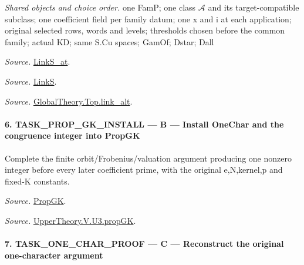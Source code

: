 \emph{Shared objects and choice order.} one FamP; one class $\mathcal A$ and its target-compatible subclass; one coefficient field per family datum; one x and i at each application; original selected rows, words and levels; thresholds chosen before the common family; actual KD; same S.Cu spaces; GamOf; Dstar; Dall

\emph{Source.} \href{https://github.com/CocoSgt/riemann-hypothesis-lean/blob/7cbf7a0c32fca1badf05931879a37c3f8a2b03b4/src/Formalism/SharpRestriction/GlobalTheoremInputs.lean#L145-L149}{LinkS\_\allowbreak at}.

\emph{Source.} \href{https://github.com/CocoSgt/riemann-hypothesis-lean/blob/7cbf7a0c32fca1badf05931879a37c3f8a2b03b4/src/Formalism/SharpRestriction/GlobalTheoremInputs.lean#L152-L157}{LinkS}.

\emph{Source.} \href{https://github.com/CocoSgt/riemann-hypothesis-lean/blob/7cbf7a0c32fca1badf05931879a37c3f8a2b03b4/src/Development/AbelianVarietyTheory/Proofs/GlobalInterpolation/LinkAlt.lean#L16-L50}{GlobalTheory.Top.link\_\allowbreak alt}.



\paragraph{6. TASK\_\allowbreak PROP\_\allowbreak GK\_\allowbreak INSTALL — B — Install OneChar and the congruence integer into PropGK}

Complete the finite orbit/Frobenius/valuation argument producing one nonzero integer before every later coefficient prime, with the original e,N,kernel,p and fixed-K constants.

\emph{Source.} \href{https://github.com/CocoSgt/riemann-hypothesis-lean/blob/7cbf7a0c32fca1badf05931879a37c3f8a2b03b4/src/Development/AutomorphicArithmetic/AutomorphicVarieties/UnitaryThreeGroups/KatoUse.lean#L36-L42}{PropGK}.

\emph{Source.} \href{https://github.com/CocoSgt/riemann-hypothesis-lean/blob/7cbf7a0c32fca1badf05931879a37c3f8a2b03b4/src/Development/AutomorphicArithmetic/AutomorphicVarieties/UnitaryThreeGroups/OrbEquiv.lean#L111-L173}{UpperTheory.V.U3.propGK}.



\paragraph{7. TASK\_\allowbreak ONE\_\allowbreak CHAR\_\allowbreak PROOF — C — Reconstruct the original one-character argument}

